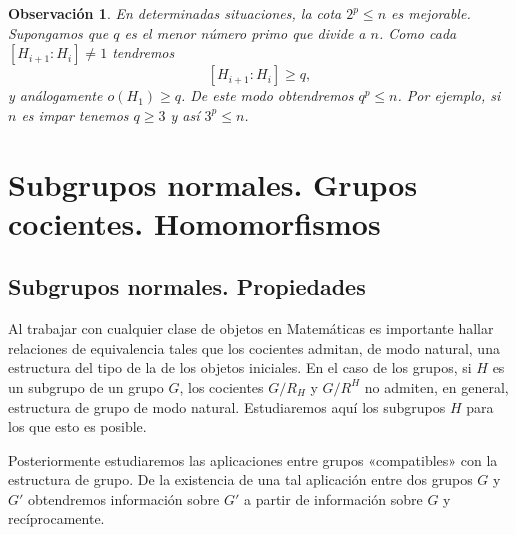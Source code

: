 \documentclass[12pt]{article}
\newtheorem{observation}{Observación}[theorem]
\begin{document}
\begin{observation}En determinadas situaciones, la cota $2^p \leq n$ es mejorable. Supongamos que $q$ es el menor número primo que divide a $n$. Como cada $[H_{i+1}:H_i] \neq 1$ tendremos $$[H_{i+1}:H_i]\geq q,$$ y análogamente $o(H_1)\geq q$. De este modo obtendremos $q^p \leq n$. Por ejemplo, si $n$ es impar tenemos $q \geq 3$ y así $3^p \leq n$.
\end{observation}
\section{Subgrupos normales. Grupos cocientes. Homomorfismos}

\subsection{Subgrupos normales. Propiedades}

Al trabajar con cualquier clase de objetos en Matemáticas es importante hallar relaciones de equivalencia tales que los cocientes admitan, de modo natural, una estructura del tipo de la de los objetos iniciales. En el caso de los grupos, si $H$ es un subgrupo de un grupo $G$, los cocientes $G/R_H$ y $G/R^H$ no admiten, en general, estructura de grupo de modo natural. Estudiaremos aquí los subgrupos $H$ para los que esto es posible. 

Posteriormente estudiaremos las aplicaciones entre grupos «compatibles» con la estructura de grupo. De la existencia de una tal aplicación entre dos grupos $G$ y $G'$ obtendremos información sobre $G'$ a partir de información sobre $G$ y recíprocamente.
\end{document}
